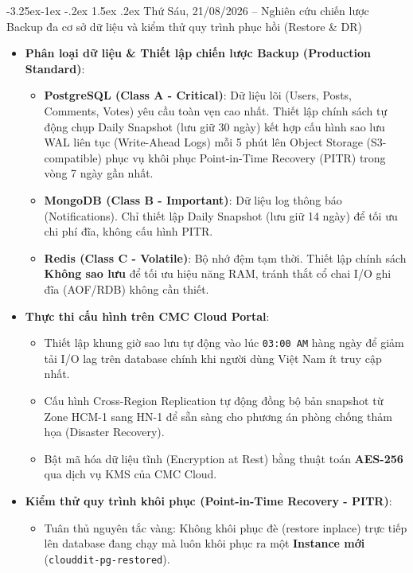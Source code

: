 \documentclass[12pt,a4paper]{article}
\makeatletter
\renewcommand\subsection{\@startsection{subsection}{2}{\z@}%
                                     {-3.25ex\@plus -1ex \@minus -.2ex}%
                                     {1.5ex \@plus .2ex}%
                                     {\normalfont\large\bfseries\color{cmcblue}}}
\makeatother
\begin{document}
\subsection{Thứ Sáu, 21/08/2026 -- Nghiên cứu chiến lược Backup đa cơ sở dữ liệu và kiểm thử quy trình phục hồi (Restore & DR)}
\begin{itemize}
    \item \textbf{Phân loại dữ liệu \& Thiết lập chiến lược Backup (Production Standard)}:
    \begin{itemize}[nosep]
        \item \textbf{PostgreSQL (Class A - Critical)}: Dữ liệu lõi (Users, Posts, Comments, Votes) yêu cầu toàn vẹn cao nhất. Thiết lập chính sách tự động chụp Daily Snapshot (lưu giữ 30 ngày) kết hợp cấu hình sao lưu WAL liên tục (Write-Ahead Logs) mỗi 5 phút lên Object Storage (S3-compatible) phục vụ khôi phục Point-in-Time Recovery (PITR) trong vòng 7 ngày gần nhất.
        \item \textbf{MongoDB (Class B - Important)}: Dữ liệu log thông báo (Notifications). Chỉ thiết lập Daily Snapshot (lưu giữ 14 ngày) để tối ưu chi phí đĩa, không cấu hình PITR.
        \item \textbf{Redis (Class C - Volatile)}: Bộ nhớ đệm tạm thời. Thiết lập chính sách \textbf{Không sao lưu} để tối ưu hiệu năng RAM, tránh thắt cổ chai I/O ghi đĩa (AOF/RDB) không cần thiết.
    \end{itemize}
    \item \textbf{Thực thi cấu hình trên CMC Cloud Portal}:
    \begin{itemize}[nosep]
        \item Thiết lập khung giờ sao lưu tự động vào lúc \texttt{03:00 AM} hàng ngày để giảm tải I/O lag trên database chính khi người dùng Việt Nam ít truy cập nhất.
        \item Cấu hình Cross-Region Replication tự động đồng bộ bản snapshot từ Zone HCM-1 sang HN-1 để sẵn sàng cho phương án phòng chống thảm họa (Disaster Recovery).
        \item Bật mã hóa dữ liệu tĩnh (Encryption at Rest) bằng thuật toán \textbf{AES-256} qua dịch vụ KMS của CMC Cloud.
    \end{itemize}
    \item \textbf{Kiểm thử quy trình khôi phục (Point-in-Time Recovery - PITR)}:
    \begin{itemize}[nosep]
        \item Tuân thủ nguyên tắc vàng: Không khôi phục đè (restore inplace) trực tiếp lên database đang chạy mà luôn khôi phục ra một \textbf{Instance mới} (\texttt{clouddit-pg-restored}).

\end{itemize}
\end{itemize}
\end{document}

